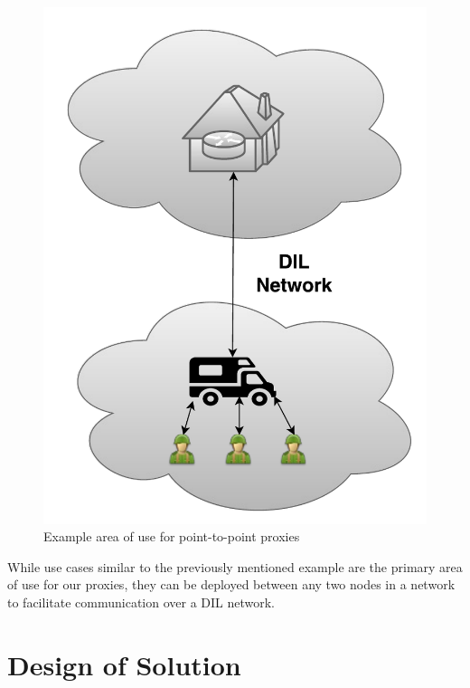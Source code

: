 \begin{figure}[h]
\includegraphics[scale=0.45]{images/use_case.pdf}
\caption{Example area of use for point-to-point proxies}
\label{figure:proxy-pair-example}
\end{figure}

While use cases similar to the previously mentioned example are the primary area
of use for our proxies, they can be deployed between any two nodes in a network to
facilitate communication over a DIL network.

\section{Design of Solution}

